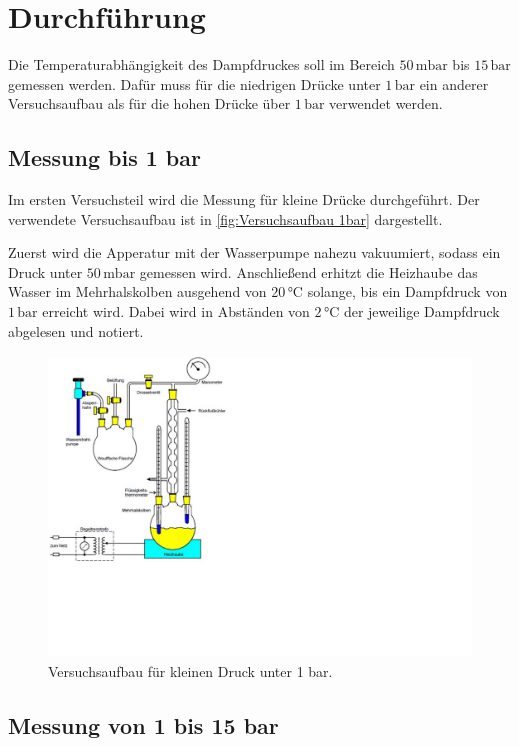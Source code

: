 \section{Durchführung}
\label{sec:Durchführung}

Die Temperaturabhängigkeit des Dampfdruckes soll im Bereich $50\,\unit{\milli\bar}$ bis $15\,\unit{\bar}$
gemessen werden.
Dafür muss für die niedrigen Drücke unter $1\,\unit{\bar}$ ein anderer Versuchsaufbau als für die hohen
Drücke über $1\,\unit{\bar}$ verwendet werden.

\subsection{Messung bis 1 bar}
\label{sec:Messung bis 1 bar}

Im ersten Versuchsteil wird die Messung für kleine Drücke durchgeführt.
Der verwendete Versuchsaufbau ist in \autoref{fig:Versuchsaufbau 1bar} dargestellt.

Zuerst wird die Apperatur mit der Wasserpumpe nahezu vakuumiert, sodass ein Druck unter $50\,\unit{\milli\bar}$ gemessen wird.
Anschließend erhitzt die Heizhaube das Wasser im Mehrhalskolben ausgehend von $20\,\unit{\celsius}$ solange, bis ein Dampfdruck
von $1\,\unit{\bar}$ erreicht wird.
Dabei wird in Abständen von $2\,\unit{\celsius}$ der jeweilige Dampfdruck abgelesen und notiert.

\begin{figure} [H]
    \centering
    \includegraphics[height=8cm]{content/Bilder/Versuchsaufbau_1bar.pdf}
    \caption{Versuchsaufbau für kleinen Druck unter 1 bar. \cite{v203}}
    \label{fig:Versuchsaufbau 1bar}
\end{figure}

\subsection{Messung von 1 bis 15 bar}
\label{sec:Messung von 1 bis 15 Bar}

